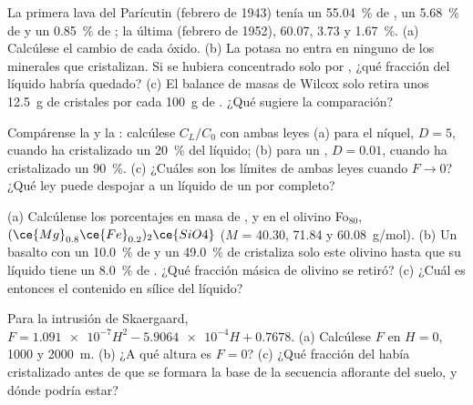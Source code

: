 \begin{exercise}[$\star$]\label{exo:b2:magmatic-differentiation:4}
La primera lava del Parícutin (febrero de 1943) tenía un \qty{55.04}{\percent} de ,
un \qty{5.68}{\percent} de  y un \qty{0.85}{\percent} de ; la última (febrero de
1952), 60.07, 3.73 y \qty{1.67}{\percent}. (a) Calcúlese el cambio de cada óxido.
(b) La potasa no entra en ninguno de los minerales que cristalizan. Si se hubiera concentrado solo por
, ¿qué fracción del líquido habría quedado?
(c) El balance de masas de Wilcox solo retira unos \qty{12.5}{g} de cristales por cada
\qty{100}{g} de . ¿Qué sugiere la comparación?
\end{exercise}

\begin{exercise}[$\star\star$]\label{exo:b2:magmatic-differentiation:5}
Compárense la  y la : calcúlese $C_L/C_0$ con ambas leyes
(a) para el níquel, $D = 5$, cuando ha cristalizado un \qty{20}{\percent} del líquido; (b)
para un , $D = 0.01$, cuando ha cristalizado un \qty{90}{\percent}.
(c) ¿Cuáles son los límites de ambas leyes cuando $F \to 0$? ¿Qué ley puede despojar a un líquido de un
 por completo?
\end{exercise}

\begin{exercise}[$\star\star$]\label{exo:b2:magmatic-differentiation:6}
(a) Calcúlense los porcentajes en masa de ,  y  en el olivino
Fo$_{80}$, $(\ce{Mg}_{0.8}\ce{Fe}_{0.2})_2\ce{SiO4}$ ($M$ = 40.30, 71.84 y
\qty{60.08}{g/mol}). (b) Un basalto con un \qty{10.0}{\percent} de  y un
\qty{49.0}{\percent} de  cristaliza solo este olivino hasta que su líquido tiene un
\qty{8.0}{\percent} de . ¿Qué fracción másica de olivino se retiró? (c) ¿Cuál
es entonces el contenido en sílice del líquido?
\end{exercise}

\begin{exercise}[$\star\star$]\label{exo:b2:magmatic-differentiation:7}
Para la intrusión de Skaergaard, $F = \num{1.091e-7}H^2 - \num{5.9064e-4}H + 0.7678$.
(a) Calcúlese $F$ en $H = 0$, 1000 y \qty{2000}{m}. (b) ¿A qué altura es $F = 0$?
(c) ¿Qué fracción del  había cristalizado antes de que se formara la base de la secuencia
aflorante del suelo, y dónde podría estar?
\end{exercise}

